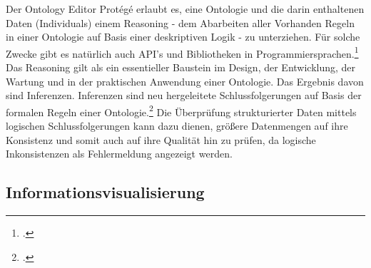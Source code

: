 \documentclass[12pt,a4paper]{article}
\begin{document}
Der Ontology Editor Protégé erlaubt es, eine Ontologie und die darin enthaltenen Daten (Individuals) einem Reasoning - dem Abarbeiten aller Vorhanden Regeln in einer Ontologie auf Basis einer deskriptiven Logik - zu unterziehen. Für solche Zwecke gibt es natürlich auch API's und Bibliotheken in Programmiersprachen.\footcite{musen2015protege} Das Reasoning gilt als ein essentieller Baustein im Design, der Entwicklung, der Wartung und in der praktischen Anwendung einer Ontologie. Das Ergebnis davon sind Inferenzen. Inferenzen sind neu hergeleitete Schlussfolgerungen auf Basis der formalen Regeln einer Ontologie.\footcite{dentler2011comparison} Die Überprüfung strukturierter Daten mittels logischen Schlussfolgerungen kann dazu dienen, größere Datenmengen auf ihre Konsistenz und somit auch auf ihre Qualität hin zu prüfen, da logische Inkonsistenzen als Fehlermeldung angezeigt werden.


\newpage
\subsection{Informationsvisualisierung}
\end{document}
